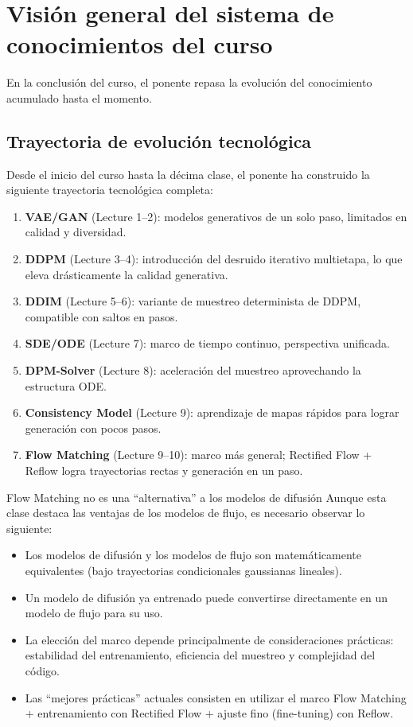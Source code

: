 \section{Visión general del sistema de conocimientos del curso}

En la conclusión del curso, el ponente repasa la evolución del conocimiento acumulado hasta el momento.

\subsection{Trayectoria de evolución tecnológica}

Desde el inicio del curso hasta la décima clase, el ponente ha construido la siguiente trayectoria tecnológica completa:

\begin{enumerate}
    \item \textbf{VAE/GAN} (Lecture 1--2): modelos generativos de un solo paso, limitados en calidad y diversidad.
    \item \textbf{DDPM} (Lecture 3--4): introducción del desruido iterativo multietapa, lo que eleva drásticamente la calidad generativa.
    \item \textbf{DDIM} (Lecture 5--6): variante de muestreo determinista de DDPM, compatible con saltos en pasos.
    \item \textbf{SDE/ODE} (Lecture 7): marco de tiempo continuo, perspectiva unificada.
    \item \textbf{DPM-Solver} (Lecture 8): aceleración del muestreo aprovechando la estructura ODE.
    \item \textbf{Consistency Model} (Lecture 9): aprendizaje de mapas rápidos para lograr generación con pocos pasos.
    \item \textbf{Flow Matching} (Lecture 9--10): marco más general; Rectified Flow + Reflow logra trayectorias rectas y generación en un paso.
\end{enumerate}

\begin{warningbox}{Flow Matching no es una ``alternativa'' a los modelos de difusión}
Aunque esta clase destaca las ventajas de los modelos de flujo, es necesario observar lo siguiente:
\begin{itemize}
    \item Los modelos de difusión y los modelos de flujo son matemáticamente equivalentes (bajo trayectorias condicionales gaussianas lineales).
    \item Un modelo de difusión ya entrenado puede convertirse directamente en un modelo de flujo para su uso.
    \item La elección del marco depende principalmente de consideraciones prácticas: estabilidad del entrenamiento, eficiencia del muestreo y complejidad del código.
    \item Las ``mejores prácticas'' actuales consisten en utilizar el marco Flow Matching + entrenamiento con Rectified Flow + ajuste fino (fine-tuning) con Reflow.
\end{itemize}
\end{warningbox}

